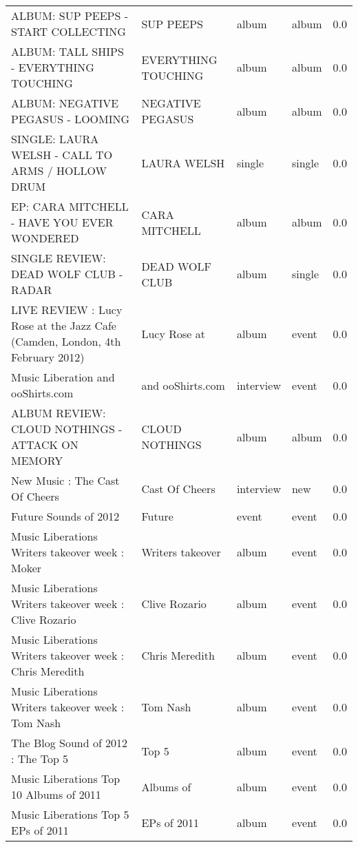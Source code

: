 \begin{tabular}{ l l l l l }
\tiny ALBUM: SUP PEEPS - START COLLECTING& \tiny SUP PEEPS& \tiny album& \tiny album& \tiny 0.0\\ 
\tiny ALBUM: TALL SHIPS - EVERYTHING TOUCHING& \tiny EVERYTHING TOUCHING& \tiny album& \tiny album& \tiny 0.0\\ 
\tiny ALBUM: NEGATIVE PEGASUS - LOOMING& \tiny NEGATIVE PEGASUS& \tiny album& \tiny album& \tiny 0.0\\ 
\tiny SINGLE: LAURA WELSH - CALL TO ARMS / HOLLOW DRUM& \tiny LAURA WELSH& \tiny single& \tiny single& \tiny 0.0\\ 
\tiny EP: CARA MITCHELL - HAVE YOU EVER WONDERED& \tiny CARA MITCHELL& \tiny album& \tiny album& \tiny 0.0\\ 
\tiny SINGLE REVIEW: DEAD WOLF CLUB - RADAR& \tiny DEAD WOLF CLUB& \tiny album& \tiny single& \tiny 0.0\\ 
\tiny LIVE REVIEW : Lucy Rose at the Jazz Cafe (Camden, London, 4th February 2012)& \tiny Lucy Rose at& \tiny album& \tiny event& \tiny 0.0\\ 
\tiny Music Liberation and ooShirts.com& \tiny and ooShirts.com& \tiny interview& \tiny event& \tiny 0.0\\ 
\tiny ALBUM REVIEW: CLOUD NOTHINGS - ATTACK ON MEMORY& \tiny CLOUD NOTHINGS& \tiny album& \tiny album& \tiny 0.0\\ 
\tiny New Music : The Cast Of Cheers& \tiny Cast Of Cheers& \tiny interview& \tiny new& \tiny 0.0\\ 
\tiny Future Sounds of 2012& \tiny Future& \tiny event& \tiny event& \tiny 0.0\\ 
\tiny Music Liberations Writers takeover week : Moker& \tiny Writers takeover& \tiny album& \tiny event& \tiny 0.0\\ 
\tiny Music Liberations Writers takeover week : Clive Rozario& \tiny Clive Rozario& \tiny album& \tiny event& \tiny 0.0\\ 
\tiny Music Liberations Writers takeover week : Chris Meredith& \tiny Chris Meredith& \tiny album& \tiny event& \tiny 0.0\\ 
\tiny Music Liberations Writers takeover week : Tom Nash& \tiny Tom Nash& \tiny album& \tiny event& \tiny 0.0\\ 
\tiny The Blog Sound of 2012 : The Top 5& \tiny Top 5& \tiny album& \tiny event& \tiny 0.0\\ 
\tiny Music Liberations Top 10 Albums of 2011& \tiny Albums of& \tiny album& \tiny event& \tiny 0.0\\ 
\tiny Music Liberations Top 5 EPs of 2011& \tiny EPs of 2011& \tiny album& \tiny event& \tiny 0.0\\ 

\end{tabular}

